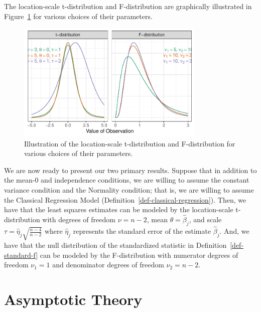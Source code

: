 \documentclass[
  letterpaper,
  DIV=11,
  numbers=noendperiod]{scrreprt}
\theoremstyle{definition}
\theoremstyle{definition}
\theoremstyle{plain}
\theoremstyle{remark}
\begin{document}
The location-scale t-distribution and F-distribution are graphically
illustrated in Figure~\ref{fig-app-theory-tf} for various choices of
their parameters.

\begin{figure}

{\centering \includegraphics[width=0.8\textwidth,height=\textheight]{./images/fig-app-theory-tf-1.pdf}

}

\caption{\label{fig-app-theory-tf}Illustration of the location-scale
t-distribution and F-distribution for various choices of their
parameters.}

\end{figure}

We are now ready to present our two primary results. Suppose that in
addition to the mean-0 and independence conditions, we are willing to
assume the constant variance condition and the Normality condition; that
is, we are willing to assume the Classical Regression Model
(Definition~\ref{def-classical-regression}). Then, we have that the
least squares estimates can be modeled by the location-scale
t-distribution with degrees of freedom \(\nu = n - 2\), mean
\(\theta = \widehat{\beta}_j\), and scale
\(\tau = \widehat{\eta}_j\sqrt{\frac{n - 4}{n - 2}}\) where
\(\widehat{\eta}_j\) represents the standard error of the estimate
\(\widehat{\beta}_j\). And, we have that the null distribution of the
standardized statistic in Definition~\ref{def-standard-f} can be modeled
by the F-distribution with numerator degrees of freedom \(\nu_1 = 1\)
and denominator degrees of freedom \(\nu_2 = n - 2\).

\hypertarget{asymptotic-theory}{%
\section{Asymptotic Theory}\label{asymptotic-theory}}
\end{document}
